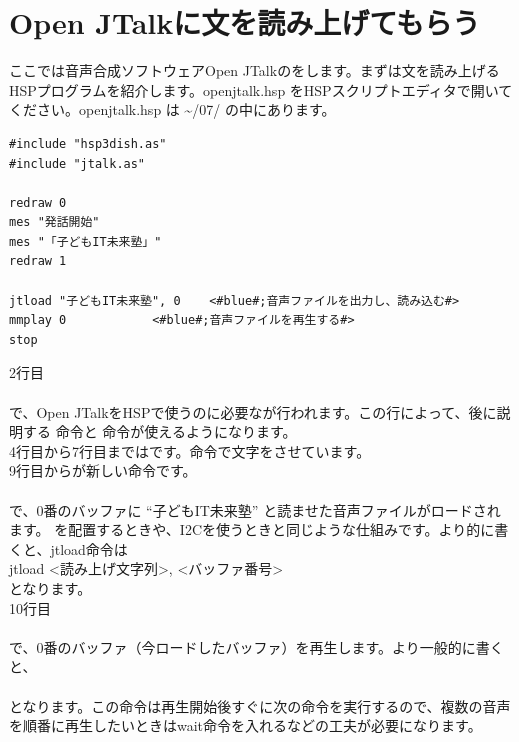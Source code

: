 \documentclass[text06.tex]{subfiles}
\begin{document}
\newpage
\section{Open JTalkに文を読み上げてもらう}
ここでは音声合成ソフトウェアOpen JTalkのをします。まずは文を読み上げるHSPプログラムを紹介します。\mbox{openjtalk.hsp} をHSPスクリプトエディタで開いてください。\mbox{openjtalk.hsp} は  \textasciitilde /07/ の中にあります。\\

\begin{lstlisting}[caption=openjtalk.hsp,label=openjtalk.hsp]
#include "hsp3dish.as"
#include "jtalk.as"

redraw 0
mes "発話開始"
mes "「子どもIT未来塾」"
redraw 1

jtload "子どもIT未来塾", 0	<#blue#;音声ファイルを出力し、読み込む#>
mmplay 0			<#blue#;音声ファイルを再生する#>
stop
\end{lstlisting}

\noindent
2行目\\
\\
で、Open JTalkをHSPで使うのに必要なが行われます。この行によって、後に説明する  命令と  命令が使えるようになります。\\
4行目から7行目まではです。命令で文字をさせています。\\
9行目からが新しい命令です。\\
\\
で、0番のバッファに “子どもIT未来塾” と読ませた音声ファイルがロードされます。 を配置するときや、I2Cを使うときと同じような仕組みです。より的に書くと、jtload命令は\\
jtload <読み上げ文字列>, <バッファ番号>\\
となります。\\
10行目\\
\\
で、0番のバッファ（今ロードしたバッファ）を再生します。より一般的に書くと、\\
\\
となります。この命令は再生開始後すぐに次の命令を実行するので、複数の音声を順番に再生したいときはwait命令を入れるなどの工夫が必要になります。\\

\begin{tcolorbox}[title=\useOmetoi]
\begin{enumerate}
\end{enumerate}
\end{tcolorbox}
\end{document}
